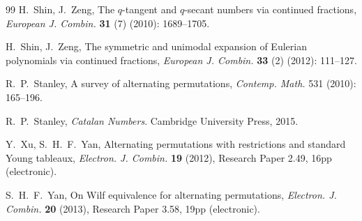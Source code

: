 \documentclass[12pt,reqno]{amsart}
\numberwithin{equation}{section}
\theoremstyle{plain}
\theoremstyle{definition}
\begin{document}
\begin{thebibliography}{99}
 H.~Shin, J.~Zeng, The $q$-tangent and $q$-secant numbers via continued fractions, \textit{European J. Combin.} {\bf 31} (7) (2010): 1689--1705.

 H.~Shin, J.~Zeng, The symmetric and unimodal expansion of Eulerian polynomials via continued fractions, \textit{European J. Combin.} {\bf 33} (2) (2012): 111--127.

 R.~P.~Stanley, A survey of alternating permutations, \textit{Contemp. Math.} 531 (2010): 165--196.

 R.~P.~Stanley, \textit{Catalan Numbers}. Cambridge University Press, 2015.

 Y.~Xu, S.~H.~F.~Yan, Alternating permutations with restrictions and standard Young tableaux, \textit{Electron. J. Combin.} {\bf 19} (2012), Research Paper 2.49, 16pp (electronic).

 S.~H.~F.~Yan, On Wilf equivalence for alternating permutations, \textit{Electron. J. Combin.} {\bf 20} (2013), Research Paper 3.58, 19pp (electronic).


\end{thebibliography}
\end{document}
